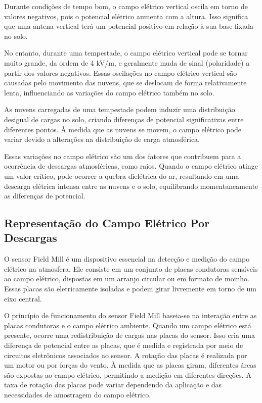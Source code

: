 \documentclass[a4paper, 12pt, onecolumn,singlespacing]{article}
\begin{document}
	Durante condições de tempo bom, o campo elétrico vertical oscila em torno de valores negativos, pois o potencial elétrico aumenta com a altura. Isso significa que uma antena vertical terá um potencial positivo em relação à sua base fixada no solo.
	
	No entanto, durante uma tempestade, o campo elétrico vertical pode se tornar muito grande, da ordem de 4 kV/m, e geralmente muda de sinal (polaridade) a partir dos valores negativos. Essas oscilações no campo elétrico vertical são causadas pelo movimento das nuvens, que se deslocam de forma relativamente lenta, influenciando as variações do campo elétrico também no solo.
	
	As nuvens carregadas de uma tempestade podem induzir uma distribuição desigual de cargas no solo, criando diferenças de potencial significativas entre diferentes pontos. À medida que as nuvens se movem, o campo elétrico pode variar devido a alterações na distribuição de carga atmosférica.
	
	Essas variações no campo elétrico são um dos fatores que contribuem para a ocorrência de descargas atmosféricas, como raios. Quando o campo elétrico atinge um valor crítico, pode ocorrer a quebra dielétrica do ar, resultando em uma descarga elétrica intensa entre as nuvens e o solo, equilibrando momentaneamente as diferenças de potencial.
	
	
	\subsection{Representação do Campo Elétrico Por Descargas}
	
	O sensor Field Mill é um dispositivo essencial na detecção e medição do campo elétrico na atmosfera. Ele consiste em um conjunto de placas condutoras sensíveis ao campo elétrico,	dispostas em um arranjo circular ou em formato de moinho. Essas placas são eletricamente isoladas e podem girar livremente em torno de um eixo central.
	
	O princípio de funcionamento do sensor Field Mill baseia-se na interação entre as placas condutoras e o campo elétrico ambiente. Quando um campo elétrico está presente, ocorre uma redistribuição de cargas nas placas do sensor. Isso cria uma diferença de potencial entre as placas, que é medida e registrada por meio de circuitos eletrônicos associados ao sensor. A rotação das placas é realizada por um motor ou por forças do vento. À medida que as placas	giram, diferentes áreas são expostas ao campo elétrico, permitindo a medição em diferentes direções. A taxa de rotação das placas pode variar dependendo da aplicação e das necessidades de amostragem do campo elétrico.
	
\end{document}

